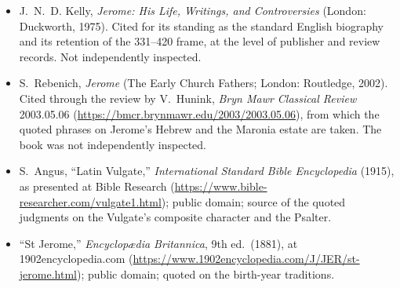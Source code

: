 \begin{itemize}
\item J.~N.~D. Kelly, \textit{Jerome: His Life, Writings, and
Controversies} (London: Duckworth, 1975). Cited for its standing as the
standard English biography and its retention of the 331--420 frame, at the
level of publisher and review records. Not independently inspected.
\item S.~Rebenich, \textit{Jerome} (The Early Church Fathers; London:
Routledge, 2002). Cited through the review by V.~Hunink, \textit{Bryn Mawr
Classical Review} 2003.05.06
(\url{https://bmcr.brynmawr.edu/2003/2003.05.06}), from which the quoted
phrases on Jerome's Hebrew and the Maronia estate are taken. The book was
not independently inspected.
\item S.~Angus, ``Latin Vulgate,'' \textit{International Standard Bible
Encyclopedia} (1915), as presented at Bible Research
(\url{https://www.bible-researcher.com/vulgate1.html}); public domain;
source of the quoted judgments on the Vulgate's composite character and the
Psalter.
\item ``St Jerome,'' \textit{Encyclop\ae dia Britannica}, 9th ed.\ (1881),
at 1902encyclopedia.com
(\url{https://www.1902encyclopedia.com/J/JER/st-jerome.html}); public
domain; quoted on the birth-year traditions.
\end{itemize}

\endgroup
